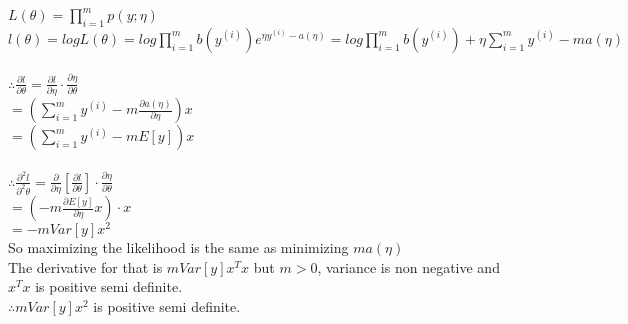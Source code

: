 \begin{answer}\\
$L(\theta)=\prod_{i=1}^{m} p(y;\eta)$\\
$l(\theta)=log L(\theta)=log \prod_{i=1}^{m}b(y^{(i)})e^{\eta y^{(i)}-a(\eta)}=log \prod_{i=1}^{m} b(y^{(i)}) + \eta \sum_{i=1}^{m}y^{(i)} -m a(\eta)$\\\\
$\therefore \frac{\partial l}{\partial \theta}=\frac{\partial l}{\partial \eta}\cdot \frac{\partial \eta}{\partial \theta}$\\
$=(\sum_{i=1}^{m}y^{(i)} - m \frac{\partial a(\eta)}{\partial \eta})x$\\
$=(\sum_{i=1}^{m}y^{(i)} - m E[y])x$\\\\
$\therefore \frac{\partial^2 l}{\partial^2 \theta}=\frac{\partial}{\partial \eta}[\frac{\partial l}{\partial \theta}] \cdot \frac{\partial \eta}{\partial \theta}$\\
$=(-m \frac{\partial E[y]}{\partial \eta}x)\cdot x$\\
$=-m Var[y] x^2$\\
So maximizing the likelihood is the same as minimizing $m a(\eta)$\\
The derivative for that is $m Var[y] x^Tx$ but $m >0$, variance is non negative and $x^Tx$ is positive semi definite.\\
$\therefore m Var[y] x^2$ is positive semi definite.
\end{answer}
